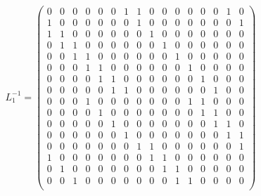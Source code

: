 \documentclass{transcrypto}
\begin{document}
\begin{appendices}
	\begin{equation*}
	L_1^{-1} = 
	\begin{pmatrix}
	0 & 0 & 0 & 0 & 0 & 0 & 1 & 1 & 0 & 0 & 0 & 0 & 0 & 0 & 1 & 0 \\ 
	1 & 0 & 0 & 0 & 0 & 0 & 0 & 1 & 0 & 0 & 0 & 0 & 0 & 0 & 0 & 1 \\ 
	1 & 1 & 0 & 0 & 0 & 0 & 0 & 0 & 1 & 0 & 0 & 0 & 0 & 0 & 0 & 0  \\ 
	0 & 1 & 1 & 0 & 0 & 0 & 0 & 0 & 0 & 1 & 0 & 0 & 0 & 0 & 0 & 0 \\ 
	0 & 0 & 1 & 1 & 0 & 0 & 0 & 0 & 0 & 0 & 1 & 0 & 0 & 0 & 0 & 0 \\ 
	0 & 0 & 0 & 1 & 1 & 0 & 0 & 0 & 0 & 0 & 0 & 1 & 0 & 0 & 0 & 0   \\ 
	0 & 0 & 0 & 0 & 1 & 1 & 0 & 0 & 0 & 0 & 0 & 0 & 1 & 0 & 0 & 0 \\ 
	0 & 0 & 0 & 0 & 0 & 1 & 1 & 0 & 0 & 0 & 0 & 0 & 0 & 1 & 0 & 0 \\ 
	0 & 0 & 0 & 1 & 0 & 0 & 0 & 0 & 0 & 0 & 0 & 1 & 1 & 0 & 0 & 0  \\ 
	0 & 0 & 0 & 0 & 1 & 0 & 0 & 0 & 0 & 0 & 0 & 0 & 1 & 1 & 0 & 0 \\ 
	0 & 0 & 0 & 0 & 0 & 1 & 0 & 0 & 0 & 0 & 0 & 0 & 0 & 1 & 1 & 0   \\ 
	0 & 0 & 0 & 0 & 0 & 0 & 1 & 0 & 0 & 0 & 0 & 0 & 0 & 0 & 1 & 1 \\ 
	0 & 0 & 0 & 0 & 0 & 0 & 0 & 1 & 1 & 0 & 0 & 0 & 0 & 0 & 0 & 1 \\ 
	1 & 0 & 0 & 0 & 0 & 0 & 0 & 0 & 1 & 1 & 0 & 0 & 0 & 0 & 0 & 0    \\ 
	0 & 1 & 0 & 0 & 0 & 0 & 0 & 0 & 0 & 1 & 1 & 0 & 0 & 0 & 0 & 0  \\ 
	0 & 0 & 1 & 0 & 0 & 0 & 0 & 0 & 0 & 0 & 1 & 1 & 0 & 0 & 0 & 0 \\ 
	\end{pmatrix}
	\end{equation*}
	

\end{appendices}
\end{document}
